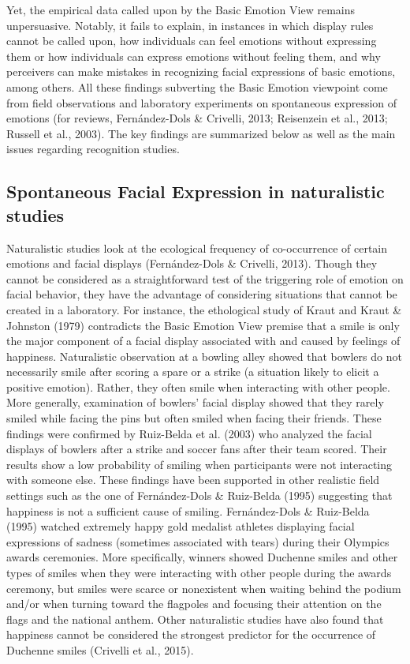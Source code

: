 \documentclass[
  english,
  man]{apa7}
\begin{document}
Yet, the empirical data called upon by the Basic Emotion View remains unpersuasive. Notably, it fails to explain, in instances in which display rules cannot be called upon, how individuals can feel emotions without expressing them or how individuals can express emotions without feeling them, and why perceivers can make mistakes in recognizing facial expressions of basic emotions, among others. All these findings subverting the Basic Emotion viewpoint come from field observations and laboratory experiments on spontaneous expression of emotions (for reviews, Fernández-Dols \& Crivelli, 2013; Reisenzein et al., 2013; Russell et al., 2003). The key findings are summarized below as well as the main issues regarding recognition studies.

\hypertarget{spontaneous-facial-expression-in-naturalistic-studies}{%
\subsection{Spontaneous Facial Expression in naturalistic studies}\label{spontaneous-facial-expression-in-naturalistic-studies}}

Naturalistic studies look at the ecological frequency of co-occurrence of certain emotions and facial displays (Fernández-Dols \& Crivelli, 2013). Though they cannot be considered as a straightforward test of the triggering role of emotion on facial behavior, they have the advantage of considering situations that cannot be created in a laboratory. For instance, the ethological study of Kraut and Kraut \& Johnston (1979) contradicts the Basic Emotion View premise that a smile is only the major component of a facial display associated with and caused by feelings of happiness. Naturalistic observation at a bowling alley showed that bowlers do not necessarily smile after scoring a spare or a strike (a situation likely to elicit a positive emotion). Rather, they often smile when interacting with other people. More generally, examination of bowlers' facial display showed that they rarely smiled while facing the pins but often smiled when facing their friends. These findings were confirmed by Ruiz-Belda et al. (2003) who analyzed the facial displays of bowlers after a strike and soccer fans after their team scored. Their results show a low probability of smiling when participants were not interacting with someone else. These findings have been supported in other realistic field settings such as the one of Fernández-Dols \& Ruiz-Belda (1995) suggesting that happiness is not a sufficient cause of smiling. Fernández-Dols \& Ruiz-Belda (1995) watched extremely happy gold medalist athletes displaying facial expressions of sadness (sometimes associated with tears) during their Olympics awards ceremonies. More specifically, winners showed Duchenne smiles and other types of smiles when they were interacting with other people during the awards ceremony, but smiles were scarce or nonexistent when waiting behind the podium and/or when turning toward the flagpoles and focusing their attention on the flags and the national anthem. Other naturalistic studies have also found that happiness cannot be considered the strongest predictor for the occurrence of Duchenne smiles (Crivelli et al., 2015).
\end{document}

